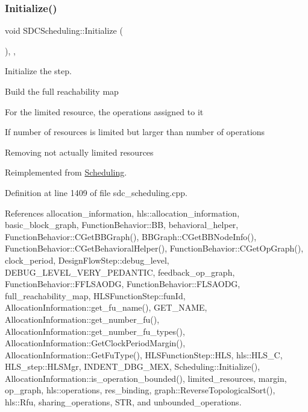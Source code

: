 \subsubsection{\texorpdfstring{Initialize()}{Initialize()}}
{\footnotesize\ttfamily void S\+D\+C\+Scheduling\+::\+Initialize (\begin{DoxyParamCaption}{ }\end{DoxyParamCaption})\hspace{0.3cm}{\ttfamily [override]}, {\ttfamily [protected]}, {\ttfamily [virtual]}}



Initialize the step. 

Build the full reachability map

For the limited resource, the operations assigned to it

If number of resources is limited but larger than number of operations

Removing not actually limited resources 

Reimplemented from \hyperlink{classScheduling_a178619eced00400e3a023a0b32784f8d}{Scheduling}.



Definition at line 1409 of file sdc\+\_\+scheduling.\+cpp.



References allocation\+\_\+information, hls\+::allocation\+\_\+information, basic\+\_\+block\+\_\+graph, Function\+Behavior\+::\+BB, behavioral\+\_\+helper, Function\+Behavior\+::\+C\+Get\+B\+B\+Graph(), B\+B\+Graph\+::\+C\+Get\+B\+B\+Node\+Info(), Function\+Behavior\+::\+C\+Get\+Behavioral\+Helper(), Function\+Behavior\+::\+C\+Get\+Op\+Graph(), clock\+\_\+period, Design\+Flow\+Step\+::debug\+\_\+level, D\+E\+B\+U\+G\+\_\+\+L\+E\+V\+E\+L\+\_\+\+V\+E\+R\+Y\+\_\+\+P\+E\+D\+A\+N\+T\+IC, feedback\+\_\+op\+\_\+graph, Function\+Behavior\+::\+F\+F\+L\+S\+A\+O\+DG, Function\+Behavior\+::\+F\+L\+S\+A\+O\+DG, full\+\_\+reachability\+\_\+map, H\+L\+S\+Function\+Step\+::fun\+Id, Allocation\+Information\+::get\+\_\+fu\+\_\+name(), G\+E\+T\+\_\+\+N\+A\+ME, Allocation\+Information\+::get\+\_\+number\+\_\+fu(), Allocation\+Information\+::get\+\_\+number\+\_\+fu\+\_\+types(), Allocation\+Information\+::\+Get\+Clock\+Period\+Margin(), Allocation\+Information\+::\+Get\+Fu\+Type(), H\+L\+S\+Function\+Step\+::\+H\+LS, hls\+::\+H\+L\+S\+\_\+C, H\+L\+S\+\_\+step\+::\+H\+L\+S\+Mgr, I\+N\+D\+E\+N\+T\+\_\+\+D\+B\+G\+\_\+\+M\+EX, Scheduling\+::\+Initialize(), Allocation\+Information\+::is\+\_\+operation\+\_\+bounded(), limited\+\_\+resources, margin, op\+\_\+graph, hls\+::operations, res\+\_\+binding, graph\+::\+Reverse\+Topological\+Sort(), hls\+::\+Rfu, sharing\+\_\+operations, S\+TR, and unbounded\+\_\+operations.

